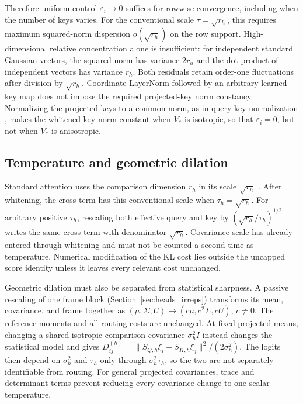 \documentclass[twoside,11pt]{article}
\begin{document}
Therefore uniform control $\varepsilon_i\to0$ suffices for rowwise convergence, including when the number of keys varies. For the conventional scale $\tau=\sqrt{r_h}$, this requires maximum squared-norm dispersion $o(\sqrt{r_h})$ on the row support. High-dimensional relative concentration alone is insufficient: for independent standard Gaussian vectors, the squared norm has variance $2r_h$ and the dot product of independent vectors has variance $r_h$. Both residuals retain order-one fluctuations after division by $\sqrt{r_h}$. Coordinate LayerNorm followed by an arbitrary learned key map does not impose the required projected-key norm constancy. Normalizing the projected keys to a common norm, as in query-key normalization \citep{Henry2020QKNorm}, makes the whitened key norm constant when $V_*$ is isotropic, so that $\varepsilon_i=0$, but not when $V_*$ is anisotropic.

\subsection{Temperature and geometric dilation}
\label{supp:temperature}

Standard attention uses the comparison dimension \(r_h\) in its scale \(\sqrt{r_h}\) \citep[Sec.~3.2.1]{vaswani2017attention}. After whitening, the cross term has this conventional scale when \(\tau_h=\sqrt{r_h}\). For arbitrary positive \(\tau_h\), rescaling both effective query and key by \((\sqrt{r_h}/\tau_h)^{1/2}\) writes the same cross term with denominator \(\sqrt{r_h}\). Covariance scale has already entered through whitening and must not be counted a second time as temperature. Numerical modification of the KL cost lies outside the uncapped score identity unless it leaves every relevant cost unchanged.

Geometric dilation must also be separated from statistical sharpness. A passive rescaling of one frame block (Section~\ref{sec:heads_irreps}) transforms its mean, covariance, and frame together as $(\mu,\Sigma,U)\mapsto(c\mu,c^2\Sigma,cU)$, $c\ne0$. The reference moments and all routing costs are unchanged. At fixed projected means, changing a shared isotropic comparison covariance $\sigma_h^2I$ instead changes the statistical model and gives $D_{ij}^{(h)}=\|S_{Q,h}\xi_i-S_{K,h}\xi_j\|^2/(2\sigma_h^2)$. The logits then depend on $\sigma_h^2$ and $\tau_h$ only through $\sigma_h^2\tau_h$, so the two are not separately identifiable from routing. For general projected covariances, trace and determinant terms prevent reducing every covariance change to one scalar temperature.
\end{document}
